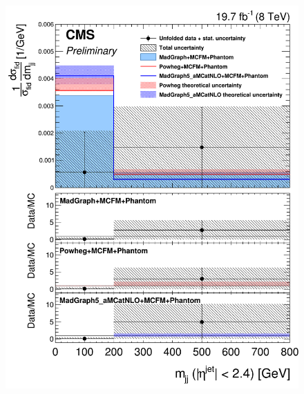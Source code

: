 \begin{figure}[hbtp]
\begin{center}
    \includegraphics[width=\cmsFigWidth]{Figures/DiffCrossSecZZTo2e2mCentralMjj_Unfolded_fr_MadGraph_norm.png}       

\end{center}
\end{figure}
